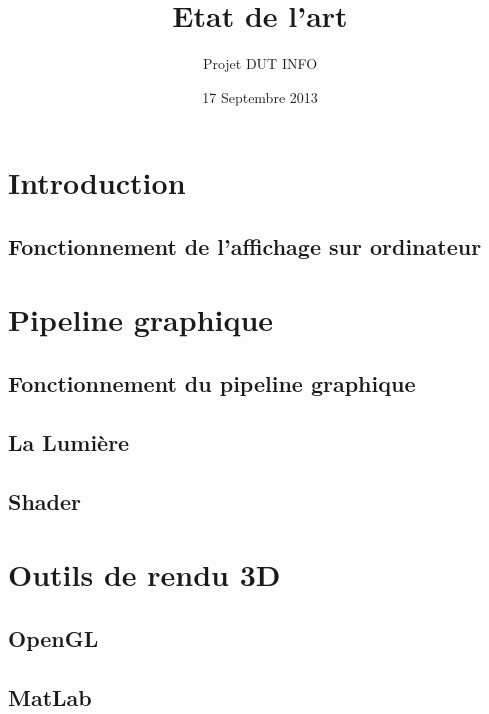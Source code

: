 \documentclass[12pt,a4paper,openany]{report}
\title{Etat de l'art}
\author{Projet DUT INFO}
\date{17 Septembre 2013}
\begin{document}
\maketitle

\hypertarget{tableofcontents}{} %
\tableofcontents

\part{Introduction}

\chapter{Fonctionnement de l'affichage sur ordinateur}


\part{Pipeline graphique}
\chapter{Fonctionnement du pipeline graphique}


\chapter{La Lumière}


\chapter{Shader}


\part{Outils de rendu 3D}

\chapter{OpenGL}


\chapter{MatLab}


\newpage

\end{document}
